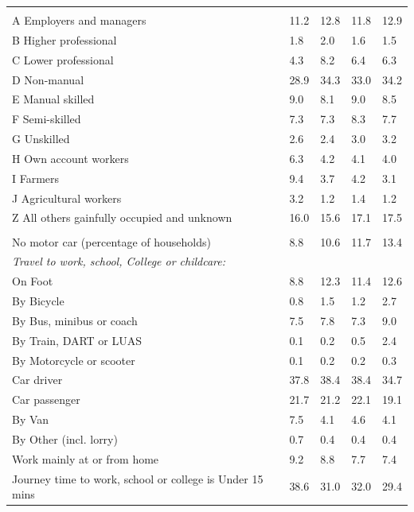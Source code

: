 \documentclass{article}
\begin{document}
\begin{table}[h]
\begin{tabular}{KTTTT}
\hline
    \\ 
    \hline
A Employers and managers & 11.2& 12.8& 11.8& 12.9\\
B Higher professional & 1.8& 2.0& 1.6& 1.5\\
C Lower professional & 4.3& 8.2& 6.4& 6.3\\
D Non-manual & 28.9& 34.3& 33.0& 34.2\\
E Manual skilled & 9.0& 8.1& 9.0& 8.5\\
F Semi-skilled & 7.3& 7.3& 8.3& 7.7\\
G Unskilled & 2.6& 2.4& 3.0& 3.2\\
H Own account workers & 6.3& 4.2& 4.1& 4.0\\
I Farmers & 9.4& 3.7& 4.2& 3.1\\
J Agricultural workers & 3.2& 1.2& 1.4& 1.2\\
Z All others gainfully occupied and unknown & 16.0& 15.6& 17.1& 17.5\\
\hline
{}\hline
    \\ 
    \hline
No motor car (percentage of households) &  8.8& 10.6& 11.7& 
13.4\\
    \hline 
\emph{Travel to work, school, College or childcare:} & & & \\
\quad On Foot &  8.8& 12.3& 11.4& 12.6\\ 
\quad By Bicycle & 0.8& 1.5& 1.2& 2.7\\ 
\quad By Bus, minibus or coach & 7.5& 7.8& 7.3& 9.0\\
\quad By Train, DART or LUAS & 0.1& 0.2& 0.5& 2.4\\
\quad By Motorcycle or scooter & 0.1& 0.2& 0.2& 0.3\\
\quad Car driver & 37.8 & 38.4& 38.4& 34.7\\
\quad Car passenger & 21.7& 21.2& 22.1& 19.1\\
\quad By Van & 7.5& 4.1& 4.6& 4.1\\
\quad By Other (incl. lorry) & 0.7& 0.4& 0.4& 0.4\\
    \hline
Work mainly at or from home & 9.2& 8.8& 7.7& 7.4\\
Journey time to work, school or college is Under 15 mins & 38.6& 31.0& 32.0& 29.4\\

\end{tabular}
\end{table}
\end{document}
